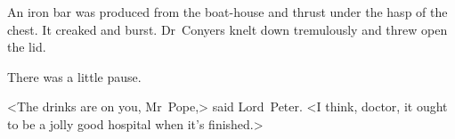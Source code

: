 An iron bar was produced from the boat-house and thrust under the hasp of the chest. It creaked and burst. Dr~Conyers knelt down tremulously and threw open the lid.

There was a little pause.

<The drinks are on you, Mr~Pope,> said Lord~Peter. <I think, doctor, it ought to be a jolly good hospital when it's finished.>